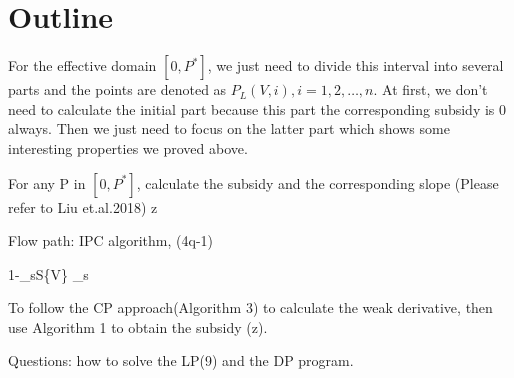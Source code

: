 \section{Outline}

For the effective domain $[0, P^*]$, we just need to divide this interval into several parts and the points are denoted as $P_L(V,i), i = 1,2,\ldots,n$.  At first, we don't need to calculate the initial part because this part the corresponding subsidy is 0 always. Then we just need to focus on the latter part which shows some interesting properties we proved above.

For any P in $[0, P^*]$, calculate the subsidy and the corresponding slope (Please refer to Liu et.al.2018) z

Flow path: IPC algorithm, (4q-1)

1-\sum_{s\in S\subset\{V\}} \rho_s

To follow the CP approach(Algorithm 3) to calculate the weak derivative, then use Algorithm 1 to obtain the subsidy \omega(z).

Questions: how to solve the LP(9) and the DP program.
